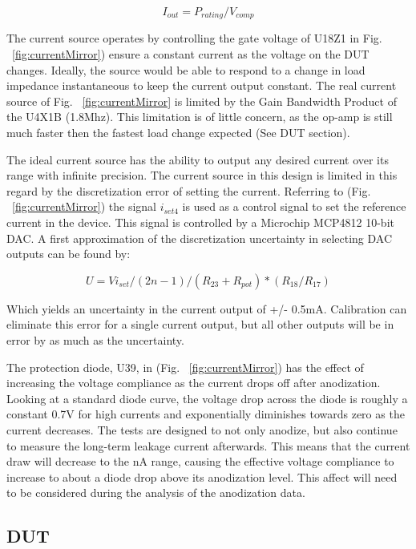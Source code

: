 \documentclass[journal]{IEEEtran}
\begin{document}
\begin{equation}
I_{out} = P_{rating} / V_{comp}
\end{equation}

The current source operates by controlling the gate voltage of U18Z1 in Fig. ~\ref{fig:currentMirror}) ensure a constant current as the voltage on the DUT changes. Ideally, the source would be able to respond to a change in load impedance instantaneous to keep the current output constant. The real current source of Fig. ~\ref{fig:currentMirror} is limited by the Gain Bandwidth Product of the U4X1B (1.8Mhz). This limitation is of little concern, as the op-amp is still much faster then the fastest load change expected (See DUT section).

The ideal current source has the ability to output any desired current over its range with infinite precision. The current source in this design is limited in this regard by the discretization error of setting the current. Referring to (Fig. ~\ref{fig:currentMirror}) the signal $i_{set4}$ is used as a control signal to set the reference current in the device. This signal is controlled by a Microchip MCP4812 10-bit DAC. A first approximation of the discretization uncertainty in selecting DAC outputs can be found by:


\begin{equation}
U = Vi_{set} /(2n-1) / (R_{23} + R_{pot}) *(R_{18}/R_{17})
\end{equation}


Which yields an uncertainty in the current output of +/- 0.5mA. Calibration can eliminate this error for a single current output, but all other outputs will be in error by as much as the uncertainty.

The protection diode, U39, in (Fig. ~\ref{fig:currentMirror}) has the effect of increasing the voltage compliance as the current drops off after anodization. Looking at a standard diode curve, the voltage drop across the diode is roughly a constant 0.7V for high currents and exponentially diminishes towards zero as the current decreases. The tests are designed to not only anodize, but also continue to measure the long-term leakage current afterwards. This means that the current draw will decrease to the nA range, causing the effective voltage compliance to increase to about a diode drop above its anodization level. This affect will need to be considered during the analysis of the anodization data.

\subsection{DUT}
\end{document}
